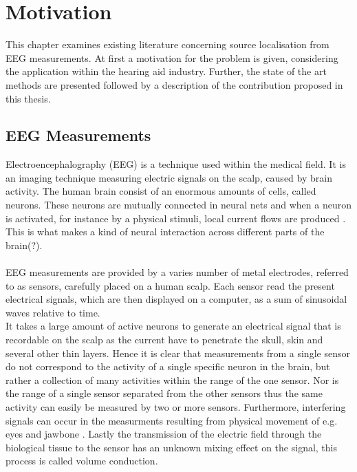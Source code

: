 \chapter{Motivation}\label{ch:motivation}
This chapter examines existing literature concerning source localisation from EEG measurements. At first a motivation for the problem is given, considering the application within the hearing aid industry. Further, the state of the art methods are presented followed by a description of the contribution proposed in this thesis.

\section{EEG Measurements}\label{sec:EEG}
Electroencephalography (EEG) is a technique used within the medical field. It is an imaging technique measuring electric signals on the scalp, caused by brain activity. 
The human brain consist of an enormous amounts of cells, called neurons. These neurons are mutually connected in neural nets and when a neuron is activated, for instance by a physical stimuli, local current flows are produced \cite{fundamentalEEG}. This is what makes a kind of neural interaction across different parts of the brain(?). 
\\
\\
EEG measurements are provided by a varies number of metal electrodes, referred to as sensors, carefully placed on a human scalp. Each sensor read the present electrical signals, which are then displayed on a computer, as a sum of sinusoidal waves relative to time.
\\
It takes a large amount of active neurons to generate an electrical signal that is recordable on the scalp as the current have to penetrate the skull, skin and several other thin layers.
Hence it is clear that measurements from a single sensor do not correspond to the activity of a single specific neuron in the brain, but rather a collection of many activities within the range of the one sensor.
Nor is the range of a single sensor separated from the other sensors thus the same activity can easily be measured by two or more sensors.
Furthermore, interfering signals can occur in the measurments resulting from physical movement of e.g. eyes and jawbone \cite{fundamentalEEG}. 
Lastly the transmission of the electric field through the biological tissue to the sensor has an unknown mixing effect on the signal, this process is called volume conduction\cite[p. 68]{EEGsignalprocessing}\cite{Van2019}.\\ \\
